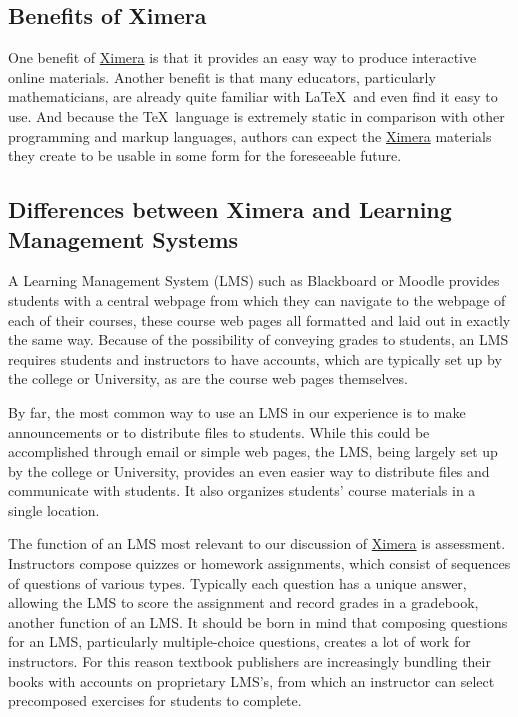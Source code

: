 \documentclass{ximera}
\begin{document}
\subsection{Benefits of Ximera}
One benefit of \href{http://ximera.osu.edu}{\sf Ximera}
is that it provides an easy way to produce interactive online materials.
Another benefit is that many educators, particularly mathematicians, are already quite familiar with \LaTeX\ and
even find it easy to use. 
And because the \TeX\ language is extremely static in comparison with other programming and markup languages, authors can expect the \href{http://ximera.osu.edu}{\sf Ximera} materials they create to be usable in some form for the foreseeable future.

\subsection{Differences between Ximera and Learning Management Systems}
A Learning Management System (LMS) such as Blackboard or Moodle provides students with a central webpage from
which they can navigate to the webpage of each of their courses, these course web pages all formatted and laid out in exactly the same way.
Because of the possibility of conveying grades to students, an LMS requires students and instructors to have accounts,
which are typically set up by the college or University, as are the course web pages themselves.

By far, the most common way to use an LMS in our experience is to make announcements or to distribute files to students.  While this could be accomplished through email or simple web pages, the LMS, being largely set up by the college or University, provides an even easier way to distribute files and communicate with students.
It also organizes students' course materials in a single location.

The function of an LMS most relevant to our discussion of \href{http://ximera.osu.edu}{\sf Ximera} is assessment.
Instructors compose quizzes or homework assignments, which consist of sequences of questions of various types.
Typically each question has a unique answer, allowing the LMS to score the assignment and record grades in a
gradebook, another function of an LMS.
It should be born in mind that composing questions for an LMS, particularly multiple-choice questions, creates a lot of work
for instructors. For this reason textbook publishers are increasingly bundling their books with accounts
on proprietary LMS's, from which an instructor can select precomposed exercises for students to complete.
\end{document}
